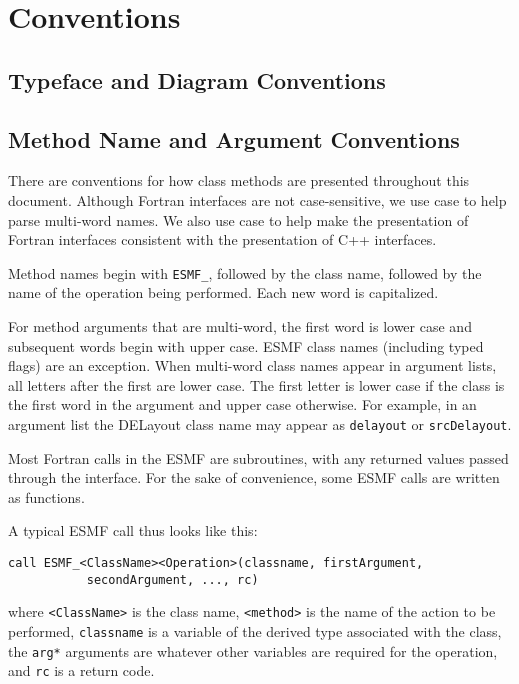 \section{Conventions}
\label{sec:conventions}

\subsection{Typeface and Diagram Conventions}



\subsection{Method Name and Argument Conventions}

There are conventions for how class methods are presented throughout 
this document.  Although Fortran interfaces are not case-sensitive,
we use case to help parse multi-word names.  We also use case to help
make the presentation of Fortran interfaces consistent with the 
presentation of C++ interfaces.  

Method names begin with {\tt ESMF\_}, followed by the class name, 
followed by the name of the operation being performed.  Each new 
word is capitalized. 

For method arguments that are multi-word, the first word is lower
case and subsequent words begin with upper case.  ESMF class 
names (including typed flags) are an exception.  When multi-word 
class names appear in argument lists, all letters after the first 
are lower case.  The first letter is lower case if the class is the
first word in the argument and upper case otherwise.  For 
example, in an argument list the DELayout class name may appear 
as {\tt delayout} or {\tt srcDelayout}.

Most Fortran calls in the ESMF are subroutines, with 
any returned values passed through the interface.  For the sake of 
convenience, some ESMF calls are written as functions.

A typical ESMF call thus looks like this:

\begin{verbatim}
call ESMF_<ClassName><Operation>(classname, firstArgument, 
           secondArgument, ..., rc)
\end{verbatim}

where \newline
{\tt <ClassName>} is the class name, \newline
{\tt <method>} is the name of the action to be performed, \newline 
{\tt classname} is a variable of the derived type associated 
with the class, \newline
the {\tt arg*} arguments are whatever other variables are required 
for the operation, \newline
and {\tt rc} is a return code. \newline


